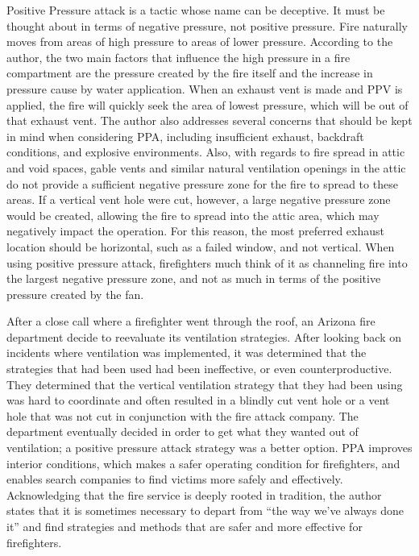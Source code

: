 \documentclass{article}
\begin{document}
\begin{appendices}
Positive Pressure attack is a tactic whose name can be deceptive. It must be thought about in terms of negative pressure, not positive pressure. Fire naturally moves from areas of high pressure to areas of lower pressure. According to the author, the two main factors that influence the high pressure in a fire compartment are the pressure created by the fire itself and the increase in pressure cause by water application. When an exhaust vent is made and PPV is applied, the fire will quickly seek the area of lowest pressure, which will be out of that exhaust vent. The author also addresses several concerns that should be kept in mind when considering PPA, including insufficient exhaust, backdraft conditions, and explosive environments. Also, with regards to fire spread in attic and void spaces, gable vents and similar natural ventilation openings in the attic do not provide a sufficient negative pressure zone for the fire to spread to these areas. If a vertical vent hole were cut, however, a large negative pressure zone would be created, allowing the fire to spread into the attic area, which may negatively impact the operation. For this reason, the most preferred exhaust location should be horizontal, such as a failed window, and not vertical. When using positive pressure attack, firefighters much think of it as channeling fire into the largest negative pressure zone, and not as much in terms of the positive pressure created by the fan.\cite{NegativeThinkingGarcia}

After a close call where a firefighter went through the roof, an Arizona fire department decide to reevaluate its ventilation strategies. After looking back on incidents where ventilation was implemented, it was determined that the strategies that had been used had been ineffective, or even counterproductive. They determined that the vertical ventilation strategy that they had been using was hard to coordinate and often resulted in a blindly cut vent hole or a vent hole that was not cut in conjunction with the fire attack company. The department eventually decided in order to get what they wanted out of ventilation; a positive pressure attack strategy was a better option. PPA improves interior conditions, which makes a safer operating condition for firefighters, and enables search companies to find victims more safely and effectively. Acknowledging that the fire service is deeply rooted in tradition, the author states that it is sometimes necessary to depart from “the way we’ve always done it” and find strategies and methods that are safer and more effective for firefighters.\cite{OpenEyesPPA}


\end{appendices}
\end{document}
